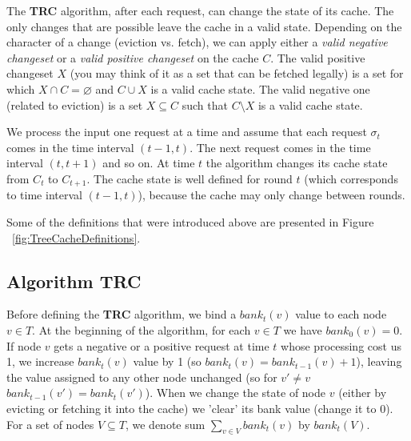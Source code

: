 The \textbf{TRC} algorithm, after each request, can change the state of its
cache. The only changes that are possible leave the cache in a valid state.
Depending on the character of a change (eviction vs. fetch), we can apply either a
\textit{valid negative changeset} or a \textit{valid positive changeset} on the
cache $C$. The valid positive changeset $X$ (you may think of it as a set that
can be fetched legally) is a set for which $X \cap C = \varnothing$ and $C \cup
X$ is a valid cache state. The valid negative one (related to eviction) is a set $X
\subseteq C$ such that $C \setminus X$ is a valid cache state.

We process the input one request at a time and assume that each request $\sigma_t$
comes in the time interval $(t-1, t)$. The next request comes in the time
interval $(t, t + 1)$ and so on. At time $t$ the algorithm changes its
cache state from $C_{t}$ to $C_{t+1}$. The cache state is well defined for round
$t$ (which corresponds to time interval $(t-1, t)$), because the cache
may only change between rounds.

Some of the definitions that were introduced above are presented in 
Figure ~\ref{fig:TreeCacheDefinitions}.



\subsection{Algorithm TRC}

Before defining the \textbf{TRC} algorithm, we bind a
$bank_{t}(v)$ value to each node $v \in T$. At the beginning of the algorithm, for each $v \in T$ we
have $bank_{0}(v) = 0$. If node $v$ gets a negative or a positive request at
time $t$ whose processing cost us 1, we increase $bank_{t}(v)$ value by 1 (so
$bank_{t}(v) = bank_{t-1}(v) + 1$), leaving the value assigned to any other node
unchanged (so for $v' \neq v$ $bank_{t-1}(v') = bank_{t}(v')$). When we change the
state of node $v$ (either by evicting or fetching it into the cache) we 'clear'
its bank value (change it to $0$). For a set of nodes $V \subseteq T$, we denote
sum $\sum_{v \in V} bank_{t}(v)$ by $bank_{t}(V)$.

